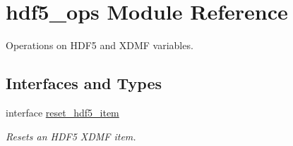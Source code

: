 \hypertarget{namespacehdf5__ops}{}\section{hdf5\+\_\+ops Module Reference}
\label{namespacehdf5__ops}


Operations on H\+D\+F5 and X\+D\+MF variables.  


\subsection*{Interfaces and Types}
\begin{DoxyCompactItemize}
\item 
interface \hyperlink{interfacehdf5__ops_1_1reset__hdf5__item}{reset\+\_\+hdf5\+\_\+item}
\begin{DoxyCompactList}\small\item\em Resets an H\+D\+F5 X\+D\+MF item. \end{DoxyCompactList}\end{DoxyCompactItemize}
